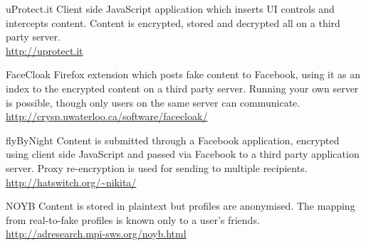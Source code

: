     \begin{desc}
    
        \item[uProtect.it] Client side JavaScript application which inserts UI controls and intercepts content. Content is encrypted, stored and decrypted all on a third party server. \hfill \\
        \url{http://uprotect.it}
        
        \item[FaceCloak] Firefox extension which posts fake content to Facebook, using it as an index to the encrypted content on a third party server. Running your own server is possible, though only users on the same server can communicate. \hfill \\
        \url{http://crysp.uwaterloo.ca/software/facecloak/}
        
        \item[flyByNight] Content is submitted through a Facebook application, encrypted using client side JavaScript and passed via Facebook to a third party application server. Proxy re-encryption is used for sending to multiple recipients. \hfill \\
        \url{http://hatswitch.org/~nikita/}
        
        \item[NOYB] Content is stored in plaintext but profiles are anonymised. The mapping from real-to-fake profiles is known only to a user's friends. \hfill \\
        \url{http://adresearch.mpi-sws.org/noyb.html}
        
    \end{desc}






